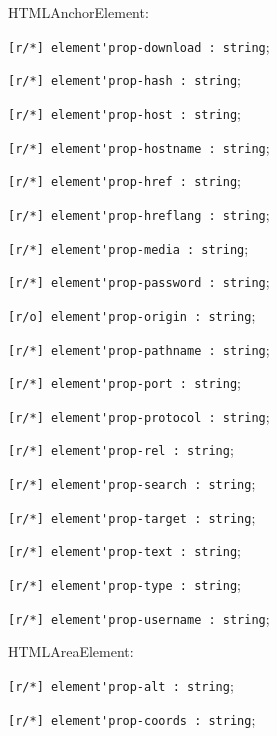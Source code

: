 \begin{icItems}
	\item HTMLAnchorElement:
	\begin{icItems}
		\item \lstinline|[r/*] element'prop-download : string|;
		\item \lstinline|[r/*] element'prop-hash : string|;
		\item \lstinline|[r/*] element'prop-host : string|;
		\item \lstinline|[r/*] element'prop-hostname : string|;
		\item \lstinline|[r/*] element'prop-href : string|;
		\item \lstinline|[r/*] element'prop-hreflang : string|;
		\item \lstinline|[r/*] element'prop-media : string|;
		\item \lstinline|[r/*] element'prop-password : string|;
		\item \lstinline|[r/o] element'prop-origin : string|;
		\item \lstinline|[r/*] element'prop-pathname : string|;
		\item \lstinline|[r/*] element'prop-port : string|;
		\item \lstinline|[r/*] element'prop-protocol : string|;
		\item \lstinline|[r/*] element'prop-rel : string|;
		\item \lstinline|[r/*] element'prop-search : string|;
		\item \lstinline|[r/*] element'prop-target : string|;
		\item \lstinline|[r/*] element'prop-text : string|;
		\item \lstinline|[r/*] element'prop-type : string|;
		\item \lstinline|[r/*] element'prop-username : string|;
	\end{icItems}
	
	\item HTMLAreaElement:
	\begin{icItems}
		\item \lstinline|[r/*] element'prop-alt : string|;
		\item \lstinline|[r/*] element'prop-coords : string|;
	\end{icItems}
	

\end{icItems}
